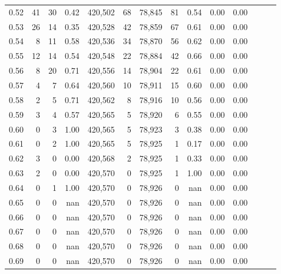 \begin{tabular}{rrrrrrrrrrrrrr}
0.52 &      41 &     30 &  0.42 &  420,502 &       68 &  78,845 &      81 &  0.54 &  0.00 &      0.00 \\
0.53 &      26 &     14 &  0.35 &  420,528 &       42 &  78,859 &      67 &  0.61 &  0.00 &      0.00 \\
0.54 &       8 &     11 &  0.58 &  420,536 &       34 &  78,870 &      56 &  0.62 &  0.00 &      0.00 \\
0.55 &      12 &     14 &  0.54 &  420,548 &       22 &  78,884 &      42 &  0.66 &  0.00 &      0.00 \\
0.56 &       8 &     20 &  0.71 &  420,556 &       14 &  78,904 &      22 &  0.61 &  0.00 &      0.00 \\
0.57 &       4 &      7 &  0.64 &  420,560 &       10 &  78,911 &      15 &  0.60 &  0.00 &      0.00 \\
0.58 &       2 &      5 &  0.71 &  420,562 &        8 &  78,916 &      10 &  0.56 &  0.00 &      0.00 \\
0.59 &       3 &      4 &  0.57 &  420,565 &        5 &  78,920 &       6 &  0.55 &  0.00 &      0.00 \\
0.60 &       0 &      3 &  1.00 &  420,565 &        5 &  78,923 &       3 &  0.38 &  0.00 &      0.00 \\
0.61 &       0 &      2 &  1.00 &  420,565 &        5 &  78,925 &       1 &  0.17 &  0.00 &      0.00 \\
0.62 &       3 &      0 &  0.00 &  420,568 &        2 &  78,925 &       1 &  0.33 &  0.00 &      0.00 \\
0.63 &       2 &      0 &  0.00 &  420,570 &        0 &  78,925 &       1 &  1.00 &  0.00 &      0.00 \\
0.64 &       0 &      1 &  1.00 &  420,570 &        0 &  78,926 &       0 &   nan &  0.00 &      0.00 \\
0.65 &       0 &      0 &   nan &  420,570 &        0 &  78,926 &       0 &   nan &  0.00 &      0.00 \\
0.66 &       0 &      0 &   nan &  420,570 &        0 &  78,926 &       0 &   nan &  0.00 &      0.00 \\
0.67 &       0 &      0 &   nan &  420,570 &        0 &  78,926 &       0 &   nan &  0.00 &      0.00 \\
0.68 &       0 &      0 &   nan &  420,570 &        0 &  78,926 &       0 &   nan &  0.00 &      0.00 \\
0.69 &       0 &      0 &   nan &  420,570 &        0 &  78,926 &       0 &   nan &  0.00 &      0.00 \\

\end{tabular}

